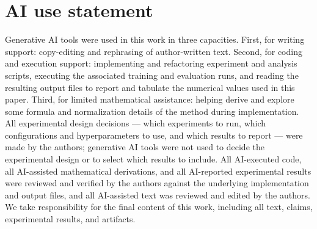 \section*{AI use statement}

Generative AI tools were used in this work in three
capacities. First, for writing support: copy-editing and rephrasing of
author-written text. Second, for coding and execution support: implementing
and refactoring experiment and analysis scripts, executing the associated
training and evaluation runs, and reading the
resulting output files to report and tabulate the numerical values used in
this paper. Third, for limited mathematical assistance: helping derive and
explore some formula and normalization details of the method during
implementation. All experimental design decisions --- which experiments to
run, which configurations and hyperparameters to use, and which results to
report --- were made by the authors; generative AI tools were not used to
decide the experimental design or to select which results to include. All
AI-executed code, all AI-assisted mathematical derivations, and all
AI-reported experimental results were reviewed and verified by the authors
against the underlying implementation and output files, and all AI-assisted
text was reviewed and edited by the authors. We take responsibility for the
final content of this work, including all text, claims, experimental results,
and artifacts.

